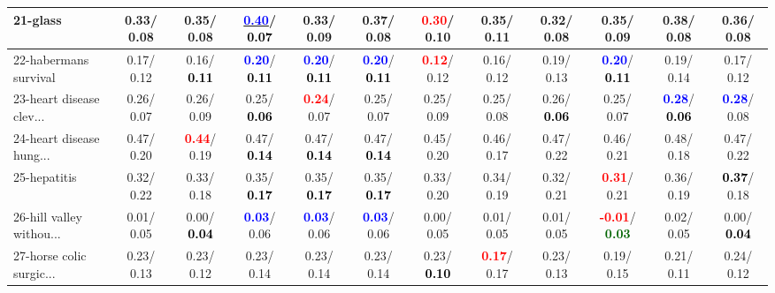 \begin{table}[h]
\begin{center}
{\begin{tabular}{lc|c|c|c|c|c|c|c|c|c|c}
21-glass &   0.33/  0.08 &   0.35/  0.08 & \underline{\textcolor{blue}{\textbf{  0.40}}}/\textcolor{black}{\textbf{  0.07}} &   0.33/  0.09 &   0.37/  0.08 & \textcolor{red}{\textbf{  0.30}}/  0.10 &   0.35/  0.11 &   0.32/  0.08 &   0.35/  0.09 &   0.38/  0.08 &   0.36/  0.08 \\ \hline
22-habermans survival &   0.17/  0.12 &   0.16/\textcolor{black}{\textbf{  0.11}} & \textcolor{blue}{\textbf{  0.20}}/\textcolor{black}{\textbf{  0.11}} & \textcolor{blue}{\textbf{  0.20}}/\textcolor{black}{\textbf{  0.11}} & \textcolor{blue}{\textbf{  0.20}}/\textcolor{black}{\textbf{  0.11}} & \textcolor{red}{\textbf{  0.12}}/  0.12 &   0.16/  0.12 &   0.19/  0.13 & \textcolor{blue}{\textbf{  0.20}}/\textcolor{black}{\textbf{  0.11}} &   0.19/  0.14 &   0.17/  0.12 \\
23-heart disease clev... &   0.26/  0.07 &   0.26/  0.09 &   0.25/\textcolor{black}{\textbf{  0.06}} & \textcolor{red}{\textbf{  0.24}}/  0.07 &   0.25/  0.07 &   0.25/  0.09 &   0.25/  0.08 &   0.26/\textcolor{black}{\textbf{  0.06}} &   0.25/  0.07 & \textcolor{blue}{\textbf{  0.28}}/\textcolor{black}{\textbf{  0.06}} & \textcolor{blue}{\textbf{  0.28}}/  0.08 \\
24-heart disease hung... &   0.47/  0.20 & \textcolor{red}{\textbf{  0.44}}/  0.19 &   0.47/\textcolor{black}{\textbf{  0.14}} &   0.47/\textcolor{black}{\textbf{  0.14}} &   0.47/\textcolor{black}{\textbf{  0.14}} &   0.45/  0.20 &   0.46/  0.17 &   0.47/  0.22 &   0.46/  0.21 &   0.48/  0.18 &   0.47/  0.22 \\
25-hepatitis &   0.32/  0.22 &   0.33/  0.18 &   0.35/\textcolor{black}{\textbf{  0.17}} &   0.35/\textcolor{black}{\textbf{  0.17}} &   0.35/\textcolor{black}{\textbf{  0.17}} &   0.33/  0.20 &   0.34/  0.19 &   0.32/  0.21 & \textcolor{red}{\textbf{  0.31}}/  0.21 &   0.36/  0.19 & \textcolor{black}{\textbf{  0.37}}/  0.18 \\
26-hill valley withou... &   0.01/  0.05 &   0.00/\textcolor{black}{\textbf{  0.04}} & \textcolor{blue}{\textbf{  0.03}}/  0.06 & \textcolor{blue}{\textbf{  0.03}}/  0.06 & \textcolor{blue}{\textbf{  0.03}}/  0.06 &   0.00/  0.05 &   0.01/  0.05 &   0.01/  0.05 & \textcolor{red}{\textbf{ -0.01}}/\textcolor{darkgreen}{\textbf{  0.03}} &   0.02/  0.05 &   0.00/\textcolor{black}{\textbf{  0.04}} \\
27-horse colic surgic... &   0.23/  0.13 &   0.23/  0.12 &   0.23/  0.14 &   0.23/  0.14 &   0.23/  0.14 &   0.23/\textcolor{black}{\textbf{  0.10}} & \textcolor{red}{\textbf{  0.17}}/  0.17 &   0.23/  0.13 &   0.19/  0.15 &   0.21/  0.11 &   0.24/  0.12 \\

\end{tabular}}
\end{center}
\end{table}
